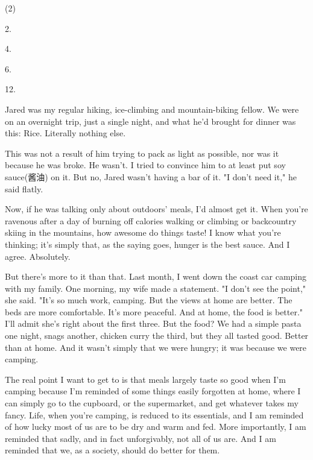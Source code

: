 \documentclass{英语试卷}
\begin{document}
\begin{choices}(2)
  \item 2.
  \item 4.
  \item 6.
  \item 12.
\end{choices}
\par Jared was my regular hiking, ice-climbing and mountain-biking fellow. We were on an overnight trip, just a single night, and what he'd brought for dinner was this: Rice. Literally nothing else.\par
\par This was not a result of him trying to pack as light as possible, nor was it because he was broke. He wasn't. I tried to convince him to at least put soy sauce(酱油) on it. But no, Jared wasn't having a bar of it. "I don't need it," he said flatly.\par
\par Now, if he was talking only about outdoors' meals, I'd almost get it. When you're ravenous after a day of burning off calories walking or climbing or backcountry skiing in the mountains, how awesome do things taste! I know what you're thinking; it's simply that, as the saying goes, hunger is the best sauce. And I agree. Absolutely.\par
\par But there's more to it than that. Last month, I went down the coast car camping with my family. One morning, my wife made a statement. "I don't see the point," she said. "It's so much work, camping. But the views at home are better. The beds are more comfortable. It's more peaceful. And at home, the food is better." I'll admit she's right about the first three. But the food? We had a simple pasta one night, snags another, chicken curry the third, but they all tasted good. Better than at home. And it wasn't simply that we were hungry; it was because we were camping.\par
\par The real point I want to get to is that meals largely taste so good when I'm camping because I'm reminded of some things easily forgotten at home, where I can simply go to the cupboard, or the supermarket, and get whatever takes my fancy. Life, when you're camping, is reduced to its essentials, and I am reminded of how lucky most of us are to be dry and warm and fed. More importantly, I am reminded that sadly, and in fact unforgivably, not all of us are. And I am reminded that we, as a society, should do better for them.\par
\end{document}
